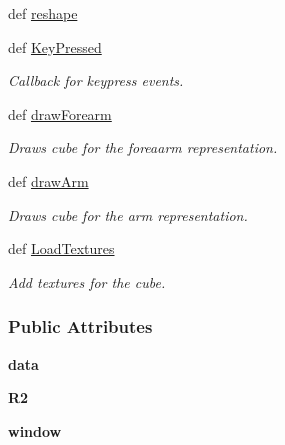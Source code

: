\begin{DoxyCompactItemize}
\item 
def \hyperlink{classcube_1_1_cube_a36bfb8dce020ea21994e63caa0275c5c}{reshape}
\item 
def \hyperlink{classcube_1_1_cube_a36d94c0f58a304cf44f34302ce824255}{Key\-Pressed}
\begin{DoxyCompactList}\small\item\em Callback for keypress events. \end{DoxyCompactList}\item 
def \hyperlink{classcube_1_1_cube_a5a9cd50b0941651a604d9671171f9810}{draw\-Forearm}
\begin{DoxyCompactList}\small\item\em Draws cube for the foreaarm representation. \end{DoxyCompactList}\item 
def \hyperlink{classcube_1_1_cube_a8bda6fd8855391222e9a1e94bac0e53f}{draw\-Arm}
\begin{DoxyCompactList}\small\item\em Draws cube for the arm representation. \end{DoxyCompactList}\item 
def \hyperlink{classcube_1_1_cube_ae58c09258290fa5e3c20c8409cf89136}{Load\-Textures}
\begin{DoxyCompactList}\small\item\em Add textures for the cube. \end{DoxyCompactList}\end{DoxyCompactItemize}
\subsubsection*{Public Attributes}
\begin{DoxyCompactItemize}
\item 
\hypertarget{classcube_1_1_cube_a0d1e3677b4638403654fc50430cae458}{{\bfseries data}}\label{classcube_1_1_cube_a0d1e3677b4638403654fc50430cae458}

\item 
\hypertarget{classcube_1_1_cube_aeffa8b0c4e591d1ff426f6554fec3431}{{\bfseries R2}}\label{classcube_1_1_cube_aeffa8b0c4e591d1ff426f6554fec3431}

\item 
\hypertarget{classcube_1_1_cube_ad952bef431eb000da224211df9e6dd78}{{\bfseries window}}\label{classcube_1_1_cube_ad952bef431eb000da224211df9e6dd78}

\end{DoxyCompactItemize}
